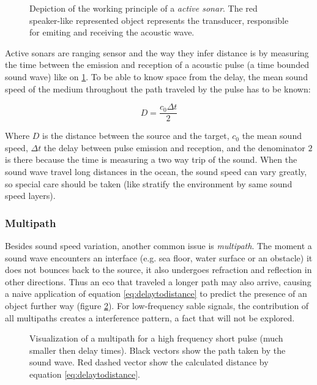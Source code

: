 \begin{figure}
	\centering
	
	\caption{Depiction of the working principle of a \textit{active sonar}. The
	red speaker-like represented object represents the transducer, responsible for
	emiting and receiving the acoustic wave.}
	\label{fig:sonar_principle}
\end{figure}

Active sonars are ranging sensor and the way they infer distance is by measuring
the time between the emission and reception of a acoustic pulse (a time bounded
sound wave) like on \ref{fig:sonar_principle}. To be able to know space from the
delay, the mean sound speed of the medium throughout the path traveled by the
pulse has to be known\cite{LURTON}:

\begin{equation}
D = \frac{c_0 \Delta t}{2}
\label{eq:delaytodistance}
\end{equation}


Where $D$ is the distance between the source and the target, $c_0$ the mean
sound speed, $\Delta t$ the delay between pulse emission and reception, and
the denominator $2$ is there because the time is measuring a two way trip of
the sound. When the sound wave travel long distances in the ocean, the sound
speed can vary greatly, so special care should be taken\cite{Etter2013} (like
stratify the environment by same sound speed layers).

\subsubsection{Multipath}

Besides sound speed variation, another common issue is \textit{multipath}. The
moment a sound wave encounters an interface (e.g. sea floor, water surface or an
obstacle) it does not bounces back to the source, it also undergoes refraction
and reflection in other directions. Thus an eco that traveled a longer path may
also arrive, causing a naive application of equation \ref{eq:delaytodistance} to
predict the presence of an object further way (figure \ref{fig:multipath}). For
low-frequency sable signals, the contribution of all multipaths creates a
interference pattern\cite{LURTON}, a fact that will not be explored. 

\begin{figure}
	\centering
	
	\caption{Visualization of a multipath for a high frequency short pulse (much
	smaller then delay times). Black vectors show the path taken by the sound
	wave. Red dashed vector show the calculated distance by equation
	\ref{eq:delaytodistance}.}
	\label{fig:multipath}
\end{figure}


